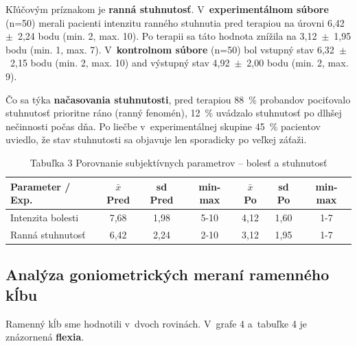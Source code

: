 Kľúčovým príznakom je \textbf{ranná stuhnutosť}. V~\textbf{experimentálnom súbore} (n=50) merali pacienti intenzitu ranného stuhnutia pred terapiou na úrovni 6,42~$\pm$~2,24 bodu (min. 2, max. 10). Po terapii sa táto hodnota znížila na 3,12~$\pm$~1,95 bodu (min. 1, max. 7). V~\textbf{kontrolnom súbore} (n=50) bol vstupný stav 6,32~$\pm$~2,15 bodu (min. 2, max. 10) and výstupný stav 4,92~$\pm$~2,00 bodu (min. 2, max. 9).

Čo sa týka \textbf{načasovania stuhnutosti}, pred terapiou 88~\% probandov pociťovalo stuhnutosť prioritne ráno (ranný fenomén), 12~\% uvádzalo stuhnutosť po dlhšej nečinnosti počas dňa. Po liečbe v~experimentálnej skupine 45~\% pacientov uviedlo, že stav stuhnutosti sa objavuje len sporadicky po veľkej záťaži.

\begin{table}[H]
\centering
\caption*{Tabuľka 3 Porovnanie subjektívnych parametrov – bolesť a stuhnutosť}
\begin{tabular}{|l|c|c|c|c|c|c|}
\hline
\textbf{Parameter / Exp.} & \textbf{$\bar{x}$ Pred} & \textbf{sd Pred} & \textbf{min-max} & \textbf{$\bar{x}$ Po} & \textbf{sd Po} & \textbf{min-max} \\ \hline
Intenzita bolesti & 7,68 & 1,98 & 5-10 & 4,12 & 1,60 & 1-7 \\ \hline
Ranná stuhnutosť & 6,42 & 2,24 & 2-10 & 3,12 & 1,95 & 1-7 \\ \hline
\end{tabular}
\end{table}

\subsection{Analýza goniometrických meraní ramenného kĺbu}

Ramenný kĺb sme hodnotili v~dvoch rovinách. V~grafe 4 a~tabuľke 4 je znázornená \textbf{flexia}.

